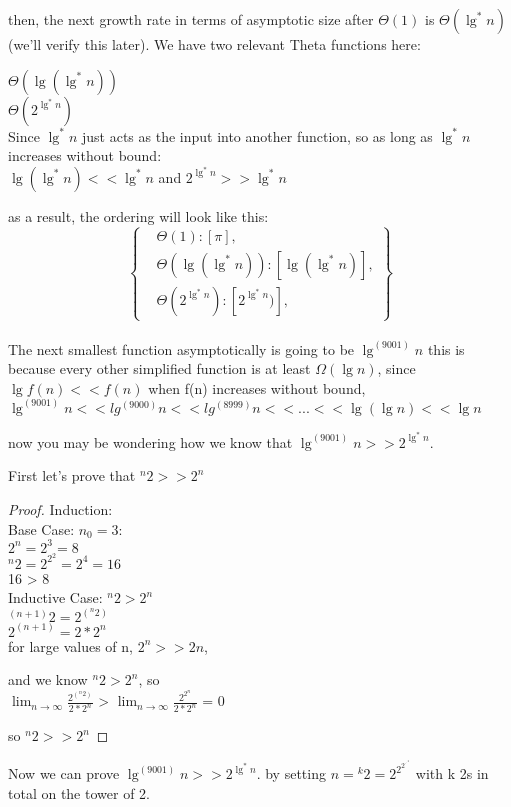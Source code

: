 \documentclass[11pt,fleqn]{article}
\theoremstyle{definition}
\theoremstyle{remark}
\begin{document}
then, the next growth rate in terms of asymptotic size after $\Theta(1)$
is $\Theta(\lg^*n)$ (we'll verify this later). We have two relevant Theta functions here: 

$\Theta(\lg(\lg^*n))$\\
$\Theta(2^{\lg^*n})$\\

Since $\lg^*n$ just acts as the input into another function, 
so as long as $\lg^*n$ increases without bound:\\

$\lg(\lg^*n) << \lg^*n$ and $2^{\lg^*n} >> \lg^*n$

as a result, the ordering will look like this:\\

\[
\left\{
\begin{aligned}
& \Theta(1): [\pi],\\
& \Theta(\lg(\lg^*n)): [\lg(\lg^*n)],\\
& \Theta(2^{\lg^*n}): [2^{\lg^*n})],
\end{aligned}
\right\}
\]\\

The next smallest function asymptotically is going to be $\lg^{(9001)} n$
this is because every other simplified function is at least $\Omega(\lg n)$,
since $\lg{f(n)} << f(n)$ when f(n) increases without bound, 
$\lg^{(9001)} n << lg^{(9000)} n << lg^{(8999)} n << ... << \lg (\lg n) << \lg n$ 

now you may be wondering how we know that $\lg^{(9001)} n >> 2^{\lg^*n}$.

First let's prove that ${}^n 2 >> 2^n$

\begin{proof}
Induction:\\

Base Case: $n_0 = 3$:\\
$2^n = 2^3 = 8$\\
${}^n 2 = 2^{2^2} = 2^4 = 16$\\
16 > 8\\

Inductive Case: ${}^n 2 > 2^n$\\
${}^{(n+1)} 2 = 2^{({}^n 2)}$\\
$2^{(n+1)} = 2 * 2^n$\\

for large values of n, $2^n >> 2n$,

and we know ${}^n 2 > 2^n$, so\\

$\lim_{n \to \infty} \frac{2^{({}^n 2)}}{2*2^n}$ >
$\lim_{n \to \infty} \frac{2^{2^n}}{2*2^n}$ = 0

so ${}^n 2 >> 2^n$
\end{proof}
Now we can prove $\lg^{(9001)} n >> 2^{\lg^*n}$. by setting $n = {}^k 2 = 2^{2^{2^{\cdot^{\cdot^{\cdot 2}}}}}$ with k
2s in total on the tower of 2.
\end{document}

